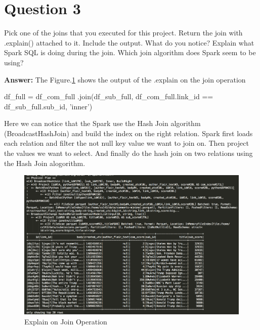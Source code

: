 \documentclass[12pt]{article}
\begin{document}
\section {Question 3}
Pick one of the joins that you executed for this project. Return the join with .explain() attached to it. Include the output. What do you notice? Explain what Spark SQL is doing during the join. Which join algorithm does Spark seem to be using?

\textbf{Answer:} The Figure.\ref{fig:explain} shows the output of the .explain on the join operation 
\begin{python}
df_full = df_com_full
	.join(df_sub_full, 
	df_com_full.link_id == df_sub_full.sub_id, 
	'inner')
\end{python}

Here we can notice that the Spark use the Hash Join algorithm (BroadcastHashJoin) and build the index on the right relation.  Spark first loads each relation and filter the not null key value we want to join on. Then project the values we want to select. And finally do the hash join on two relations using the Hash Join alogorithm.

\begin{figure}[!h]
     \begin{center}
                  \includegraphics[width=1.12\textwidth]{explain.png}
    \end{center}
    \caption{%
       Explain on Join Operation
     }%
     \label {fig:explain}
 \end{figure}
 
\end{document}
